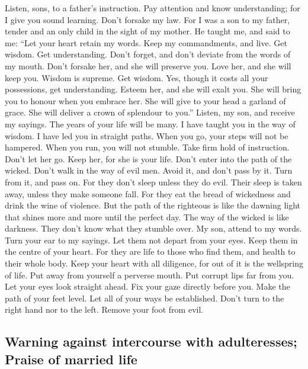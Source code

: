  Listen, sons, to a father's instruction. Pay attention
and know understanding;  for I give you sound learning.
Don't forsake my law.  For I was a son to my father,
tender and an only child in the sight of my mother.  He
taught me, and said to me: ``Let your heart retain my words. Keep my
commandments, and live.  Get wisdom. Get understanding.
Don't forget, and don't deviate from the words of my mouth.
 Don't forsake her, and she will preserve you. Love her,
and she will keep you.  Wisdom is supreme. Get wisdom.
Yes, though it costs all your possessions, get understanding.
 Esteem her, and she will exalt you. She will bring you to
honour when you embrace her.  She will give to your head a
garland of grace. She will deliver a crown of splendour to you.''
 Listen, my son, and receive my sayings. The years of
your life will be many.  I have taught you in the way of
wisdom. I have led you in straight paths.  When you go,
your steps will not be hampered. When you run, you will not stumble.
 Take firm hold of instruction. Don't let her go. Keep
her, for she is your life.  Don't enter into the path of
the wicked. Don't walk in the way of evil men.  Avoid it,
and don't pass by it. Turn from it, and pass on.  For
they don't sleep unless they do evil. Their sleep is taken away, unless
they make someone fall.  For they eat the bread of
wickedness and drink the wine of violence.  But the path
of the righteous is like the dawning light that shines more and more
until the perfect day.  The way of the wicked is like
darkness. They don't know what they stumble over.  My
son, attend to my words. Turn your ear to my sayings. 
Let them not depart from your eyes. Keep them in the centre of your
heart.  For they are life to those who find them, and
health to their whole body.  Keep your heart with all
diligence, for out of it is the wellspring of life.  Put
away from yourself a perverse mouth. Put corrupt lips far from you.
 Let your eyes look straight ahead. Fix your gaze
directly before you.  Make the path of your feet level.
Let all of your ways be established.  Don't turn to the
right hand nor to the left. Remove your foot from evil.

\hypertarget{warning-against-intercourse-with-adulteresses-praise-of-married-life}{%
\subsection{Warning against intercourse with adulteresses; Praise of
married
life}\label{warning-against-intercourse-with-adulteresses-praise-of-married-life}}

